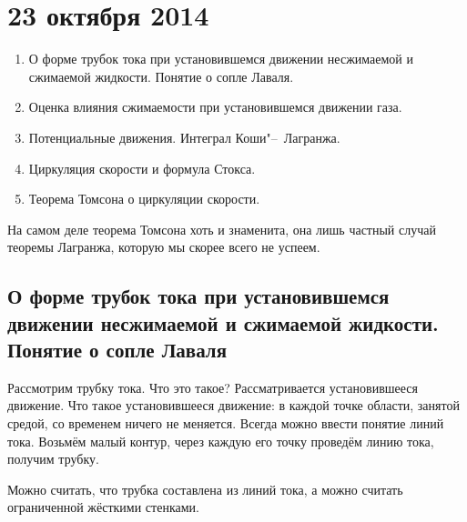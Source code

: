 \section{23 октября 2014}
\begin{enumerate}
  \item О форме трубок тока при установившемся движении несжимаемой и сжимаемой жидкости. Понятие о сопле Лаваля.
  \item Оценка влияния сжимаемости при установившемся движении газа.
  \item Потенциальные движения. Интеграл Коши"--~Лагранжа.
  \item Циркуляция скорости и формула Стокса.
  \item Теорема Томсона о циркуляции скорости.
\end{enumerate}
На самом деле теорема Томсона хоть и знаменита, она лишь частный случай теоремы Лагранжа, которую мы скорее всего не успеем.
\subsection{О форме трубок тока при установившемся движении несжимаемой и сжимаемой жидкости. Понятие о сопле Лаваля}
Рассмотрим трубку тока. Что это такое? Рассматривается установившееся движение. Что такое установившееся движение: в каждой точке области, занятой средой, со временем ничего не меняется. Всегда можно ввести понятие линий тока. Возьмём малый контур, через каждую его точку проведём линию тока, получим трубку.

Можно считать, что трубка составлена из линий тока, а можно считать ограниченной жёсткими стенками.

